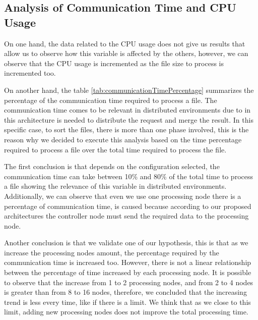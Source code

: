 \subsection{Analysis of Communication Time and CPU Usage }

On one hand, the data related to the CPU usage does not give us results that allow us to observe how this variable is affected by the others, however, we can observe that the CPU usage is incremented as the file size to process is incremented too.

On another hand, the table \ref{tab:communicationTimePercentage} summarizes the percentage of the communication time required to process a file. The communication time comes to be relevant in distributed environments due to in this architecture is needed to distribute the request and merge the result. In this specific case, to sort the files, there is more than one phase involved, this is the reason why we decided to execute this analysis based on the time percentage required to process a file over the total time required to process the file.

The first conclusion is that depends on the configuration selected, the communication time can take between 10\% and 80\% of the total time to process a file showing the relevance of this variable in distributed environments. Additionally, we can observe that even we use one processing node there is a percentage of communication time, is caused because according to our proposed architectures the controller node must send the required data to the processing node. 

Another conclusion is that we validate one of our hypothesis, this is that as we increase the processing nodes amount, the percentage required by the communication time is increased too. However, there is not a linear relationship between the percentage of time increased by each processing node. It is possible to observe that the increase from 1 to 2 processing nodes, and from 2 to 4 nodes is greater than from 8 to 16 nodes, therefore, we concluded that the increasing trend is less every time, like if there is a limit. We think that as we close to this limit, adding new processing nodes does not improve the total processing time.

